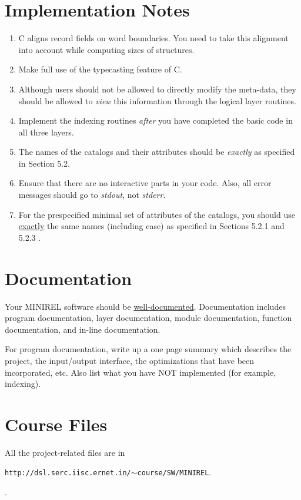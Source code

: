 \section{Implementation Notes}
\begin{enumerate}
\item C aligns record fields on word boundaries.  You need
to take this alignment into account while computing sizes of structures.
\item Make full use of the typecasting feature of C.
\item Although users should not be allowed to directly modify the meta-data,
they should be allowed to \emph{view} this information through the 
logical layer routines.
\item Implement the indexing routines \emph{after} you have completed
the basic code in all three layers.
\item The names of the catalogs and their attributes
should be \emph{exactly} as specified in Section 5.2.
\item Ensure that there are no interactive parts in your code.  Also,
all error messages should go to \emph{stdout}, not \emph{stderr}.
\item For the prespecified minimal set of attributes of the 
catalogs, you should use \underline{exactly} the same names (including
case) as specified in Sections 5.2.1 and 5.2.3 \/ . 
\end{enumerate}

\section{Documentation}
Your MINIREL software should be \underline{well-documented}.
Documentation includes program documentation, layer documentation,
module documentation, function documentation, and in-line
documentation.

\medskip

\noindent
For program documentation, write up a one page summary which
describes the project, the input/output interface, the optimizations
that have been incorporated, etc.  Also list what you have NOT
implemented (for example, indexing).

\section{Course Files}
All the project-related files are in~ 
\begin{latexonly}
\mbox{{\tt http://dsl.serc.iisc.ernet.in/$\sim$course/SW/MINIREL}}.
\end{latexonly}
\begin{htmlonly}
.

\end{htmlonly}

